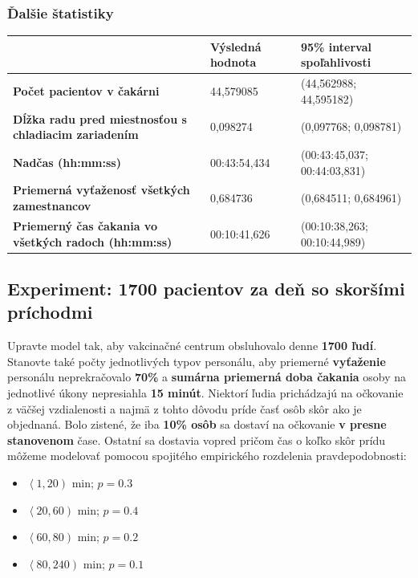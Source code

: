 \documentclass[letterpaper]{article}
\begin{document}
	\subsubsection*{Ďalšie štatistiky}
	
	\begin{table}[hbt!]
		\begin{tabular}{p{6cm}|p{4.5cm}p{4.5cm}}
			& \textbf{Výsledná hodnota} & \textbf{95\% interval spoľahlivosti} \\
			\hline\hline
			\textbf{Počet pacientov v čakárni} 								& 44,579085           & (44,562988; 44,595182)			
			\\\hline
			\textbf{Dĺžka radu pred miestnosťou s chladiacim zariadením}	& 0,098274            & (0,097768; 0,098781)	
			\\\hline
			\textbf{Nadčas (hh:mm:ss)}										& 00:43:54,434        & (00:43:45,037; 00:44:03,831)
			\\\hline
			\textbf{Priemerná vyťaženosť všetkých zamestnancov}  			& 0,684736            & (0,684511; 0,684961)
			\\\hline
			\textbf{Priemerný čas čakania vo všetkých radoch (hh:mm:ss)}	& 00:10:41,626        & (00:10:38,263; 00:10:44,989)
		\end{tabular}
	\end{table}
	
	\subsection{Experiment: 1700 pacientov za deň so skoršími príchodmi}
	
	Upravte model tak, aby vakcinačné centrum obsluhovalo denne \textbf{1700 ľudí}. Stanovte také počty jednotlivých typov personálu, aby priemerné \textbf{vyťaženie} personálu neprekračovalo \textbf{70\%} a \textbf{sumárna priemerná doba čakania} osoby na jednotlivé úkony nepresiahla \textbf{15 minút}. Niektorí ľudia prichádzajú na očkovanie z väčšej vzdialenosti a najmä z tohto dôvodu príde časť osôb skôr ako je objednaná. Bolo zistené, že iba \textbf{10\% osôb} sa dostaví na očkovanie \textbf{v presne stanovenom} čase. Ostatní sa dostavia vopred pričom čas o koľko skôr prídu môžeme modelovať pomocou spojitého empirického rozdelenia pravdepodobnosti: 
	\begin{itemize}
		\item $ \left\langle 1, 20 \right) $ min; $ p = 0.3 $
		\item $ \left\langle 20, 60 \right) $ min; $ p = 0.4 $
		\item $ \left\langle 60, 80 \right) $ min; $ p = 0.2 $
		\item $ \left\langle 80, 240 \right) $ min; $ p = 0.1 $
	\end{itemize}
\end{document}
